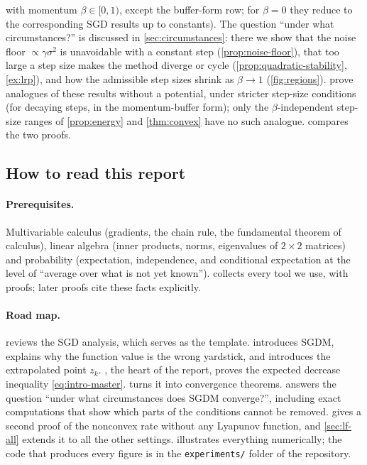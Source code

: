 \begin{table}[ht]
{with momentum $\beta\in[0,1)$, except the buffer-form row; for $\beta=0$ they reduce to the
corresponding SGD results up to constants). The question ``under what circumstances?'' is discussed in
\cref{sec:circumstances}: there we show that the noise floor $\propto\gamma\sigma^2$ is
unavoidable with a constant step (\cref{prop:noise-floor}), that too large a step size
makes the method diverge or cycle (\cref{prop:quadratic-stability},
\cref{ex:lrp}), and how the admissible step sizes shrink as $\beta\to1$
(\cref{fig:regions}).  prove analogues of these results without a
potential, under stricter step-size conditions (for decaying steps, in the momentum-buffer
form); only the $\beta$-independent step-size ranges of \cref{prop:energy} and
\cref{thm:convex} have no such analogue.  compares the two proofs.}
\label{tab:summary}
\end{table}

\subsection{How to read this report}

\paragraph{Prerequisites.} Multivariable calculus (gradients, the chain rule, the
fundamental theorem of calculus), linear algebra (inner products, norms, eigenvalues of
$2\times2$ matrices) and probability (expectation, independence, and conditional
expectation at the level of ``average over what is not yet known''). 
collects every tool we use, with proofs; later proofs cite these facts explicitly.

\paragraph{Road map.}  reviews the SGD analysis, which serves as the
template.  introduces SGDM, explains why the function value is the
wrong yardstick, and introduces the extrapolated point $z_k$. , the heart
of the report, proves the expected decrease inequality \eqref{eq:intro-master}.
 turns it into convergence theorems. 
answers the question ``under what circumstances does SGDM converge?'', including exact
computations that show which parts of the conditions cannot be removed.
 gives a second proof of the nonconvex rate without any Lyapunov
function, and \cref{sec:lf-all} extends it to all the other settings.  illustrates everything numerically; the code that produces every
figure is in the \texttt{experiments/} folder of the repository.


